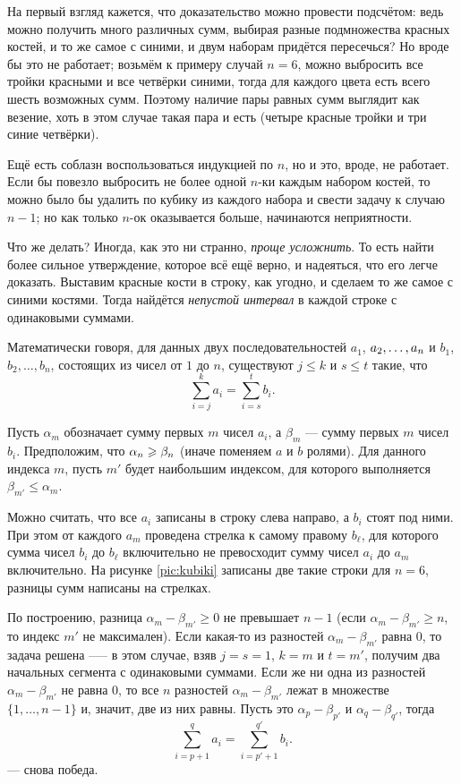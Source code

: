 На первый взгляд кажется, что доказательство можно провести  подсчётом: ведь можно получить много различных сумм, выбирая разные подмножества красных костей, и то же самое с синими, и двум наборам придётся пересечься?
Но вроде бы это не работает;
возьмём к примеру случай $n = 6$,  можно выбросить все тройки красными и все четвёрки синими, тогда для каждого цвета есть всего шесть возможных сумм.
Поэтому наличие пары равных сумм выглядит как везение,
хоть в этом случае такая пара и есть (четыре красные тройки и три синие четвёрки).

Ещё есть соблазн воспользоваться индукцией по $n$, но и это, вроде, не работает.
Если бы повезло выбросить не более одной $n$-ки каждым набором костей,
то можно было бы удалить по кубику из каждого набора и свести задачу к случаю $n-1$;
но как только $n$-ок оказывается больше, начинаются неприятности.

Что же делать?
Иногда, как это ни странно, \emph{проще усложнить}.
То есть найти более сильное утверждение, которое всё ещё верно, и надеяться, что его легче доказать.
Выставим красные кости в строку, как угодно, и сделаем то же самое с синими костями.
Тогда найдётся \emph{непустой интервал} в каждой строке с одинаковыми суммами.

Математически говоря, для данных двух последовательностей  $a_1$, $a_2,\z\dots,a_n$ и $b_1$, $b_2,\dots,b_n$, состоящих из чисел от $1$ до $n$, существуют 
$j\le k$ и 
$s\le t$ такие, что 
\[\sum_{i=j}^ka_i=\sum_{i=s}^tb_i.\]

Пусть $\alpha_m$ обозначает сумму первых $m$ чисел $a_i$,
а $\beta_m$ --- сумму первых $m$ чисел $b_i$.
Предположим, что $\alpha_n\z\ge \beta_n$ (иначе поменяем $a$ и $b$ ролями).
Для данного индекса $m$, пусть $m'$ будет наибольшим индексом, для которого выполняется $\beta_{m'}\le \alpha_m$.

Можно считать, что все $a_i$ записаны в строку слева направо, а $b_i$ стоят под ними.
При этом от каждого $a_m$ проведена стрелка к самому правому $b_\ell$, для которого сумма чисел $b_i$ до $b_\ell$ включительно не превосходит сумму чисел $a_i$ до $a_m$ включительно.
На рисунке \ref{pic:kubiki} записаны две такие строки для $n=6$,
разницы сумм написаны на стрелках.


По построению, разница $\alpha_m-\beta_{m'}\ge 0$ не превышает $n-1$ 
(если $\alpha_m-\beta_{m'}\ge n$, то индекс $m'$ не максимален).
Если какая-то из разностей $\alpha_m-\beta_{m'}$ равна $0$, то задача решена ----- в этом случае, взяв $j=s=1$, $k=m$ и $t=m'$, получим два начальных сегмента с одинаковыми суммами.
Если же ни одна из разностей $\alpha_m-\beta_{m'}$ не равна $0$, то все $n$ разностей 
$\alpha_m-\beta_{m'}$ лежат в множестве $\{1,\dots,n-1\}$ и, значит, две из них равны.
Пусть это $\alpha_p-\beta_{p'}$ и $\alpha_q-\beta_{q'}$, тогда 
\[\sum_{i=p+1}^qa_i=\sum_{i=p'+1}^{q'}b_i.\]
--- снова победа.

